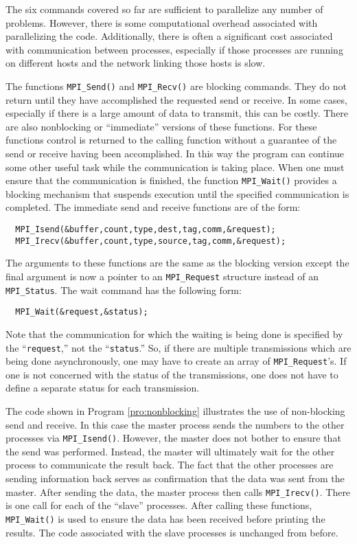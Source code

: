 The six commands covered so far are sufficient to parallelize any
number of problems.  However, there is some computational overhead
associated with parallelizing the code.  Additionally, there is often
a significant cost associated with communication between processes,
especially if those processes are running on different hosts and the
network linking those hosts is slow.

The functions {\tt MPI\_Send()} and {\tt MPI\_Recv()} are blocking
commands.  They do not return until they have accomplished the
requested send or receive.  In some cases, especially if there is a
large amount of data to transmit, this can be costly.  There are also
nonblocking or ``immediate'' versions of these functions.  For these
functions control is returned to the calling function without a
guarantee of the send or receive having been accomplished.  In this
way the program can continue some other useful task while the
communication is taking place.  When one must ensure that the
communication is finished, the function {\tt MPI\_Wait()} provides a
blocking mechanism that suspends execution until the specified
communication is completed.  The immediate send and receive functions
are of the form:
\begin{verbatim}
  MPI_Isend(&buffer,count,type,dest,tag,comm,&request);
  MPI_Irecv(&buffer,count,type,source,tag,comm,&request);
\end{verbatim}
The arguments to these functions are the same as the blocking version
except the final argument is now a pointer to an {\tt MPI\_Request}
structure instead of an {\tt MPI\_Status}.  The wait command has the
following form:
\begin{verbatim}
  MPI_Wait(&request,&status);
\end{verbatim}
Note that the communication for which the waiting is being done is
specified by the ``{\tt request},'' not the ``{\tt status}.''  So, if
there are multiple transmissions which are being done asynchronously,
one may have to create an array of {\tt MPI\_Request}'s.  If one is
not concerned with the status of the transmissions, one does not have
to define a separate status for each transmission.

The code shown in Program \ref{pro:nonblocking} illustrates the use of
non-blocking send and receive.  In this case the master process sends
the numbers to the other processes via {\tt MPI\_Isend()}.  However,
the master does not bother to ensure that the send was performed.
Instead, the master will ultimately wait for the other process to
communicate the result back.  The fact that the other processes are
sending information back serves as confirmation that the data was sent
from the master.  After sending the data, the master process then
calls {\tt MPI\_Irecv()}.  There is one call for each of the ``slave''
processes.  After calling these functions, {\tt MPI\_Wait()} is used
to ensure the data has been received before printing the results.  The
code associated with the slave processes is unchanged from before.

